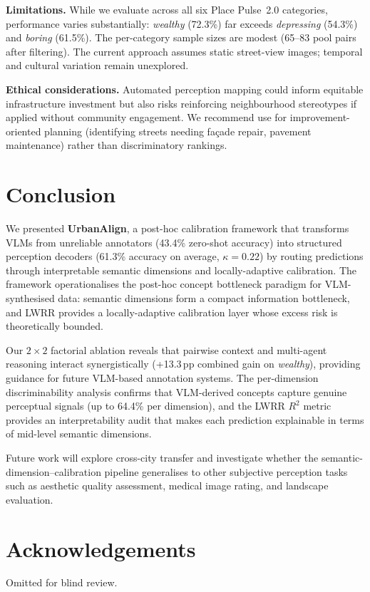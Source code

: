 \documentclass[runningheads]{llncs}
\begin{document}
\smallskip\noindent\textbf{Limitations.}
While we evaluate across all six Place Pulse~2.0 categories, performance varies substantially: \emph{wealthy} (72.3\%) far exceeds \emph{depressing} (54.3\%) and \emph{boring} (61.5\%).
The per-category sample sizes are modest (65--83 pool pairs after filtering).
The current approach assumes static street-view images; temporal and cultural variation remain unexplored.

\smallskip\noindent\textbf{Ethical considerations.}
Automated perception mapping could inform equitable infrastructure investment but also risks reinforcing neighbourhood stereotypes if applied without community engagement.
We recommend use for improvement-oriented planning (identifying streets needing fa\c{c}ade repair, pavement maintenance) rather than discriminatory rankings.


\section{Conclusion}
\label{sec:conclusion}

We presented \textbf{UrbanAlign}, a post-hoc calibration framework that transforms VLMs from unreliable annotators (43.4\% zero-shot accuracy) into structured perception decoders (61.3\% accuracy on average, $\kappa{=}0.22$) by routing predictions through interpretable semantic dimensions and locally-adaptive calibration.
The framework operationalises the post-hoc concept bottleneck paradigm for VLM-synthesised data: semantic dimensions form a compact information bottleneck, and LWRR provides a locally-adaptive calibration layer whose excess risk is theoretically bounded.

Our $2{\times}2$ factorial ablation reveals that pairwise context and multi-agent reasoning interact synergistically (+13.3\,pp combined gain on \emph{wealthy}), providing guidance for future VLM-based annotation systems.
The per-dimension discriminability analysis confirms that VLM-derived concepts capture genuine perceptual signals (up to 64.4\% per dimension), and the LWRR $R^{2}$ metric provides an interpretability audit that makes each prediction explainable in terms of mid-level semantic dimensions.

Future work will explore cross-city transfer and investigate whether the semantic-dimension--calibration pipeline generalises to other subjective perception tasks such as aesthetic quality assessment, medical image rating, and landscape evaluation.

\section*{Acknowledgements}
Omitted for blind review.



\end{document}
